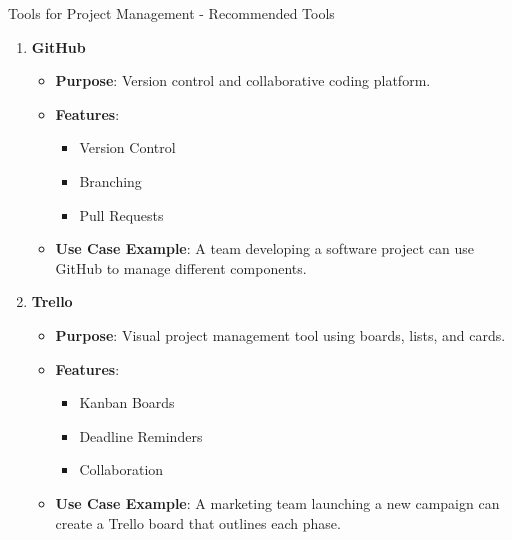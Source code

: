 \documentclass[aspectratio=169]{beamer}
\begin{document}
\begin{frame}[fragile]{Tools for Project Management - Recommended Tools}
    \begin{enumerate}
        \item \textbf{GitHub}
        \begin{itemize}
            \item \textbf{Purpose}: Version control and collaborative coding platform.
            \item \textbf{Features}:
            \begin{itemize}
                \item Version Control
                \item Branching
                \item Pull Requests
            \end{itemize}
            \item \textbf{Use Case Example}: A team developing a software project can use GitHub to manage different components.
        \end{itemize}
        
        \item \textbf{Trello}
        \begin{itemize}
            \item \textbf{Purpose}: Visual project management tool using boards, lists, and cards.
            \item \textbf{Features}:
            \begin{itemize}
                \item Kanban Boards
                \item Deadline Reminders
                \item Collaboration
            \end{itemize}
            \item \textbf{Use Case Example}: A marketing team launching a new campaign can create a Trello board that outlines each phase.
        \end{itemize}
    \end{enumerate}
\end{frame}
\end{document}
